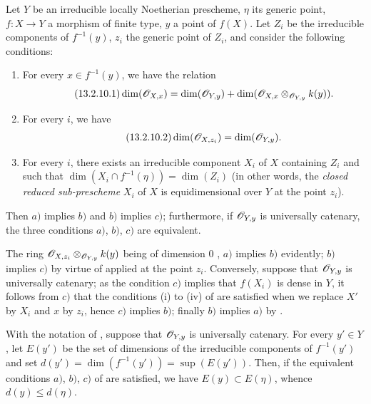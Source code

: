 \begin{proposition}[13.2.10]
\label{IV.13.2.10}
Let $Y$ be an irreducible locally Noetherian prescheme, $\eta$ its generic point, $f:X\to Y$ a morphism of finite type, $y$ a point of $f(X)$.
Let $Z_i$ be the
irreducible components of $f^{-1}(y)$, $z_i$ the generic point of $Z_i$, and consider the following conditions:
\begin{enumerate}[label=\emph{\alph*)}]
  \item For every $x\in f^{-1}(y)$, we have the relation
  \[
  \tag{13.2.10.1}
\label{IV.13.2.10.1}
    \dim(\mathscr{O}_{X,x})=\dim(\mathscr{O}_{Y,y})+\dim(\mathscr{O}_{X,x}\otimes_{\mathscr{O}_{Y,y}}k(y)).
  \]
  \item For every $i$, we have
  \[
  \label{IV.13.2.10.2}
\tag{13.2.10.2}
    \dim(\mathscr{O}_{X,z_i})=\dim(\mathscr{O}_{Y,y}).
  \]
  \item For every $i$, there exists an irreducible component $X_i$ of $X$ containing $Z_i$ and such that $\dim(X_i\cap f^{-1}(\eta))=\dim(Z_i)$ (in other words, the \emph{closed reduced sub-prescheme} $X_i$ of $X$ is equidimensional over $Y$ at the point $z_i$).
\end{enumerate}
Then $a)$ implies $b)$ and $b)$ implies $c)$; furthermore, if $\mathscr{O}_{Y,y}$ is universally catenary, the three conditions $a)$, $b)$, $c)$ are equivalent.
\end{proposition}

The ring $\mathscr{O}_{X,z_i}\otimes_{\mathscr{O}_{Y,y}}k(y)$ being of dimension $0$ , $a)$ implies $b)$ evidently; $b)$ implies $c)$ by virtue of  applied at the point $z_i$.
Conversely, suppose that $\mathscr{O}_{Y,y}$ is universally catenary; as the condition $c)$ implies that $f(X_i)$ is dense in $Y$, it follows from $c)$ that the conditions (i) to (iv) of  are satisfied when we replace $X'$ by $X_i$ and $x$ by $z_i$, hence $c)$ implies $b)$; finally $b)$ implies $a)$ by .

\begin{corollary}[13.2.11]
\label{IV.13.2.11}
With the notation of , suppose that $\mathscr{O}_{Y,y}$ is universally catenary.
For every $y'\in Y$, let $E(y')$ be the set of dimensions of the irreducible components of $f^{-1}(y')$ and set $d(y')=\dim(f^{-1}(y'))=\sup(E(y'))$.
Then, if the equivalent conditions $a)$, $b)$, $c)$ of  are satisfied, we have $E(y)\subset E(\eta)$, whence $d(y)\leq d(\eta)$.
\end{corollary}

